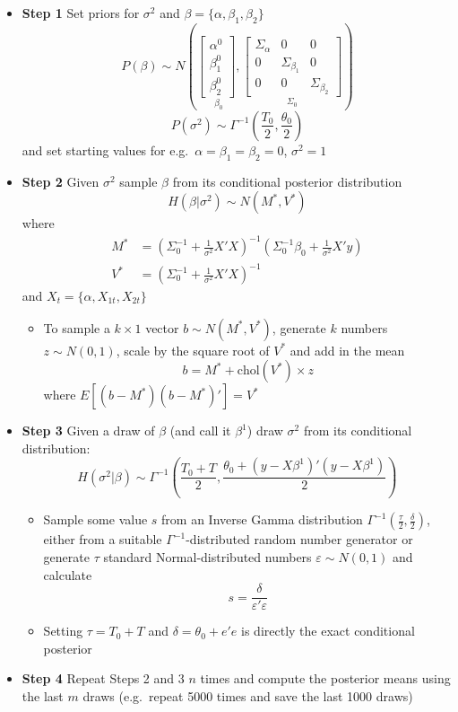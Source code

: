 \documentclass[
  letterpaper,
]{book}
\providecommand{\tightlist}{%
  \setlength{\itemsep}{0pt}\setlength{\parskip}{0pt}}\usepackage{longtable,booktabs,array}
\begin{document}
\begin{itemize}
\item
  \textbf{Step 1} Set priors for \(\sigma^2\) and
  \(\beta=\{\alpha, \beta_1, \beta_2\}\) \[
  P(\beta) \sim N\left( \underset{\beta_{0}}{\left[ 
  \begin{array}{c}
  \alpha^0 \\ 
  \beta_1^0 \\ 
  \beta_2^0
  \end{array}
  \right],}\underset{\Sigma_0} {\left[ 
  \begin{array}{ccc}
  \Sigma_{\alpha} & 0 & 0 \\ 
  0 & \Sigma_{\beta_1} & 0 \\ 
  0 & 0 & \Sigma_{\beta_2}
  \end{array}
  \right] }\right)
  \] \[
  P(\sigma^2) \sim \Gamma^{-1}\left( \frac{T_{0}}{2},\frac{\theta_0}{2}\right)
  \] and set starting values for e.g.~\(\alpha=\beta_1=\beta_2=0\),
  \(\sigma^2=1\)
\item
  \textbf{Step 2} Given \(\sigma^2\) sample \(\beta\) from its
  conditional posterior distribution \[
   H(\beta|\sigma^2) \sim N(M^*, V^*)
  \] where \[
  \begin{align}
  M^* &= \left(\Sigma_0^{-1} + \frac{1}{\sigma^2} X'X\right)^{-1} \left(\Sigma_0^{-1} \beta_0+\frac{1}{\sigma^2}X'y\right)\\
  V^* &= \left(\Sigma_0^{-1}+\frac{1}{\sigma^2} X'X\right)^{-1}
  \end{align}
  \] and \(X_t = \{\alpha, X_{1t}, X_{2t}\}\)

  \begin{itemize}
  \tightlist
  \item
    To sample a \(k\times 1\) vector \(b \sim N(M^*,V^*)\), generate
    \(k\) numbers \(z \sim N(0,1)\), scale by the square root of \(V^*\)
    and add in the mean \[
     b = M^* + \mbox{chol}(V^*) \times z
    \] where \(E[(b-M^*)(b-M^*)'] = V^*\)
  \end{itemize}
\item
  \textbf{Step 3} Given a draw of \(\beta\) (and call it \(\beta^1\))
  draw \(\sigma^2\) from its conditional distribution: \[
   H(\sigma^2 | \beta) \sim \Gamma^{-1}\left( \frac{T_0+T}{2}, \frac{\theta_0 + (y-X\beta^1)'(y-X\beta^1)}{2}\right) 
  \]

  \begin{itemize}
  \tightlist
  \item
    Sample some value \(s\) from an Inverse Gamma distribution
    \(\Gamma^{-1}(\frac{\tau}{2},\frac{\delta}{2})\), either from a
    suitable \(\Gamma^{-1}\)-distributed random number generator or
    generate \(\tau\) standard Normal-distributed numbers
    \(\varepsilon \sim N(0,1)\) and calculate \[
    s = \frac{\delta}{\varepsilon'\varepsilon}
    \]
  \item
    Setting \(\tau = T_0+T\) and \(\delta = \theta_0 + e'e\) is directly
    the exact conditional posterior
  \end{itemize}
\item
  \textbf{Step 4} Repeat Steps 2 and 3 \(n\) times and compute the
  posterior means using the last \(m\) draws (e.g.~repeat 5000 times and
  save the last 1000 draws)
\end{itemize}
\end{document}
